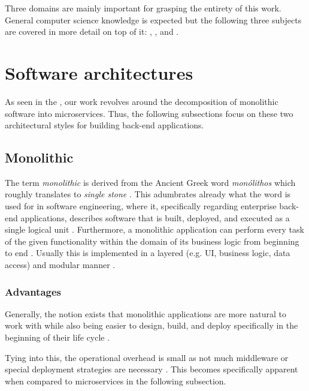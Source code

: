 \documentclass[12pt,a4paper]{report}
\begin{document}
Three domains are mainly important for grasping the entirety of this work.
General computer science knowledge is expected but the following
three subjects are covered in more detail on top of it:
\textit{},
\textit{}, and
\textit{}.



\section{Software architectures} \label{sect:background-architecture}

As seen in the \textit{}, our work revolves around
the decomposition of monolithic software into microservices.
Thus, the following subsections focus on these two architectural styles for
building back-end applications.


\subsection{Monolithic}

The term \textit{monolithic} is derived from the Ancient Greek word
\textit{monólithos} which roughly translates to \textit{single stone} \cite{press2011oxford}.
This adumbrates already what the word is used for in software engineering,
where it, specifically regarding enterprise back-end applications,
describes software that is built, deployed, and executed
as a single logical unit \cite{ms-fowler}.
Furthermore, a monolithic application can perform every task of the given functionality
within the domain of its business logic from beginning to end \cite{monolith}.
Usually this is implemented in a layered (e.g. UI, business logic, data access)
and modular manner \cite{ms-fowler, monolith}.


\subsubsection{Advantages}
Generally, the notion exists that monolithic applications are more natural
to work with while also being easier to design, build, and deploy specifically
in the beginning of their life cycle \cite{ms-fowler, raymond2003unix}.

Tying into this, the operational overhead is small as not much middleware or
special deployment strategies are necessary \cite{ms-fowler}.
This becomes specifically apparent when compared to microservices
in the following subsection.
\end{document}
